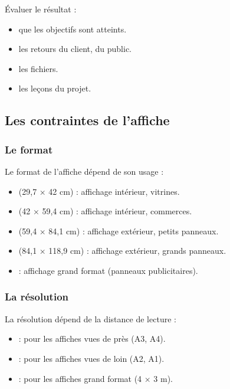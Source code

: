 Évaluer le résultat :

\begin{itemize}
    \item {} que les objectifs sont atteints.
    \item {} les retours du client, du public.
    \item {} les fichiers.
    \item {} les leçons du projet.
\end{itemize}

\subsection{Les contraintes de l'affiche}

\subsubsection{Le format}

Le format de l'affiche dépend de son usage :

\begin{itemize}
    \item {} (29,7 × 42 cm) : affichage intérieur, vitrines.
    \item {} (42 × 59,4 cm) : affichage intérieur, commerces.
    \item {} (59,4 × 84,1 cm) : affichage extérieur, petits panneaux.
    \item {} (84,1 × 118,9 cm) : affichage extérieur, grands panneaux.
    \item {} : affichage grand format (panneaux publicitaires).
\end{itemize}

\subsubsection{La résolution}

La résolution dépend de la distance de lecture :

\begin{itemize}
    \item {} : pour les affiches vues de près (A3, A4).
    \item {} : pour les affiches vues de loin (A2, A1).
    \item {} : pour les affiches grand format (4 × 3 m).
\end{itemize}

